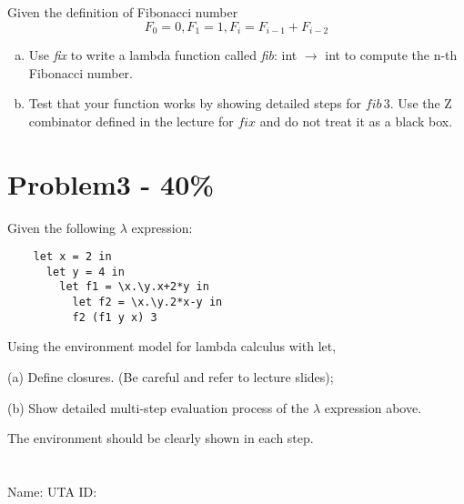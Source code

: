 \documentclass{article}
\newcommand{\answerboxbig}{
    \vspace{20cm} %
}
\newcommand{\studentinfo}{
    \noindent Name: \underline{\hspace{5cm}} UTA ID: \underline{\hspace{5cm}}\\
    \vspace{0.5cm} %
}
\begin{document}
Given the definition of Fibonacci number
\[F_0 = 0, F_1 = 1, F_i = F_{i-1} + F_{i-2}\]
\begin{enumerate}[(a)]
\item Use \textit{fix} to write a lambda function called \textit{fib}: int $\rightarrow$ int to compute the n-th Fibonacci number.
\item Test that your function works by showing detailed steps for $fib \, 3$. Use the Z combinator defined in the lecture for $fix$ and do not treat it as a black box.
\end{enumerate}
\answerboxbig

\section*{Problem3 - 40\%}

	Given the following $\lambda$ expression:
 
	\begin{verbatim}
	let x = 2 in
	  let y = 4 in
	    let f1 = \x.\y.x+2*y in
	      let f2 = \x.\y.2*x-y in
	      f2 (f1 y x) 3
	\end{verbatim}


	
	Using the environment model for lambda calculus with let,
		
	(a) Define closures. (Be careful and refer to lecture slides);
	 
	(b) Show detailed multi-step evaluation process of the $\lambda$ expression above. 
 
 
 The environment should be clearly shown in each step.

\section*{}
\answerboxbig

\studentinfo
\end{document}
